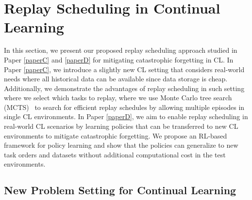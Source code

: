 \section{Replay Scheduling in Continual Learning}\label{chap4:sec:replay_scheduling_in_cl}

In this section, we present our proposed replay scheduling approach studied in Paper \ref{paperC} and \ref{paperD} for mitigating catastrophic forgetting in CL. In Paper  \ref{paperC}, we introduce a slightly new CL setting that considers real-world needs where all historical data can be available since data storage is cheap. Additionally, we demonstrate the advantages of replay scheduling in such setting where we select which tasks to replay, where we use Monte Carlo tree search (MCTS)~\cite{coulom2006efficient} to search for efficient replay schedules by allowing multiple episodes in single CL environments. In Paper \ref{paperD}, we aim to enable replay scheduling in real-world CL scenarios by learning policies that can be transferred to new CL environments to mitigate catastrophic forgetting. We propose an RL-based framework for policy learning and show that the policies can generalize to new task orders and datasets without additional computational cost in the test environments. 




\subsection{New Problem Setting for Continual Learning}

